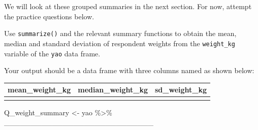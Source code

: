 \documentclass[
  letterpaper,
  DIV=11,
  numbers=noendperiod]{scrreprt}
\newenvironment{Shaded}{\begin{snugshade}}{\end{snugshade}}
\newcommand{\NormalTok}[1]{\textcolor[rgb]{0.00,0.23,0.31}{#1}}
\newcommand{\OtherTok}[1]{\textcolor[rgb]{0.00,0.23,0.31}{#1}}
\newcommand{\SpecialCharTok}[1]{\textcolor[rgb]{0.37,0.37,0.37}{#1}}
\begin{document}
We will look at these grouped summaries in the next section. For now,
attempt the practice questions below.

\begin{tcolorbox}[enhanced jigsaw, colframe=quarto-callout-tip-color-frame, rightrule=.15mm, opacityback=0, breakable, coltitle=black, colbacktitle=quarto-callout-tip-color!10!white, bottomrule=.15mm, leftrule=.75mm, toprule=.15mm, arc=.35mm, bottomtitle=1mm, colback=white, left=2mm, opacitybacktitle=0.6, titlerule=0mm, title=\textcolor{quarto-callout-tip-color}{\faLightbulb}\hspace{0.5em}{Practice}, toptitle=1mm]

Use \texttt{summarize()} and the relevant summary functions to obtain
the mean, median and standard deviation of respondent weights from the
\texttt{weight\_kg} variable of the \texttt{yao} data frame.

Your output should be a data frame with three columns named as shown
below:

\begin{longtable}[]{@{}lll@{}}
\toprule\noalign{}
mean\_weight\_kg & median\_weight\_kg & sd\_weight\_kg \\
\midrule\noalign{}
\endhead
\bottomrule\noalign{}
\endlastfoot
& & \\
\end{longtable}

\begin{Shaded}
\begin{Highlighting}[]
\NormalTok{Q\_weight\_summary }\OtherTok{\textless{}{-}} 
\NormalTok{  yao }\SpecialCharTok{\%\textgreater{}\%}
\NormalTok{  \_\_\_\_\_\_\_\_\_\_\_\_\_\_\_\_\_\_\_\_\_\_\_\_\_\_\_\_}
\end{Highlighting}
\end{Shaded}

\end{tcolorbox}
\end{document}
